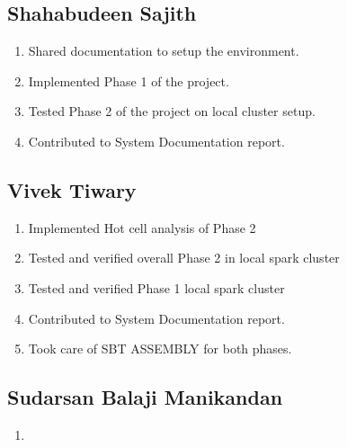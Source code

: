 \subsection{Shahabudeen Sajith}
\begin{enumerate}
    \item Shared documentation to setup the environment.
    \item Implemented Phase 1 of the project.
    \item Tested Phase 2 of the project on local cluster setup.
    \item Contributed to System Documentation report.
\end{enumerate}

\subsection{Vivek Tiwary}
\begin{enumerate}
    \item Implemented Hot cell analysis of Phase 2
    \item Tested and verified overall Phase 2 in local spark cluster
    \item Tested and verified Phase 1 local spark cluster
    \item Contributed to System Documentation report.
    \item Took care of SBT ASSEMBLY for both phases.
\end{enumerate}

\subsection{Sudarsan Balaji Manikandan}
\begin{enumerate}
    \item 
\end{enumerate}



\newpage



